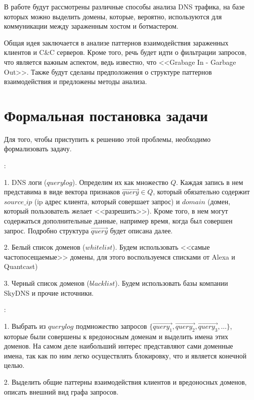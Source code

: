 \documentclass[a4paper,14pt]{extreport} %
\begin{document}
В работе будут рассмотрены различные способы анализа DNS трафика, на базе которых можно выделить домены, которые, вероятно, используются для коммуникации между зараженным хостом и ботмастером.

Общая идея заключается в анализе паттернов взаимодействия зараженных клиентов и C\&C серверов. Кроме того, речь будет идти о фильтрации запросов, что является важным аспектом, ведь известно, что <<Grabage In - Garbage Out>>. Также будут сделаны предположения о структуре паттернов взаимодействия и предложены методы анализа.

\chapter{Формальная постановка задачи}
Для того, чтобы приступить к решению этой проблемы, необходимо формализовать задачу.

{:}
		
1. DNS логи ($querylog$). Определим их как множество $Q$. Каждая запись в нем представима в виде вектора признаков $\vec{query}$$\in$$Q$, который обязательно содержит $source\_ip$ (ip адрес клиента, который совершает запрос) и $domain$ (домен, который пользователь желает <<разрешить>>). Кроме того, в нем могут содержаться дополнительные данные, например время, когда был совершен запрос. Подробно структура $\vec{query}$ будет описана далее.
		
2. Белый список доменов ($whitelist$). Будем использовать <<самые частопосещаемые>> домены, для этого воспользуемся списками от Alexa и Quantcast)
		
3. Черный список доменов ($blacklist$). Будем использовать базы компании SkyDNS и прочие источники.
	
{:} 
	
1. Выбрать из $querylog$ подмножество 
запросов $\{\vec{query_1}, \vec{query_2}, \vec{query_3}, \dots\}$, которые были совершены к вредоносным доменам и выделить имена этих доменов. На самом деле наибольший интерес представляют сами доменные имена, так как по ним легко осуществлять блокировку, что и является конечной целью.
	
2. Выделить общие паттерны взаимодействия клиентов и вредоносных доменов, описать внешний вид графа запросов.

\newpage
\end{document}
